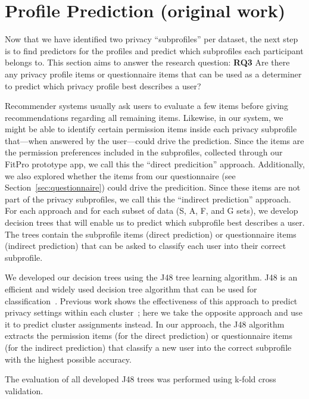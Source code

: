 \section{Profile Prediction (original work)}
\label{sec:prediction}


Now that we have identified two privacy ``subprofiles'' per dataset, the next step is to find predictors for the profiles and predict which subprofiles each participant belongs to. This section aims to answer the research question: \textbf{RQ3} Are there any privacy profile items or questionnaire items that can be used as a determiner to predict which privacy profile best describes a user? 

Recommender systems usually ask users to evaluate a few items before giving recommendations regarding all remaining items. Likewise, in our system, we might be able to identify certain permission items inside each privacy subprofile that---when answered by the user---could drive the prediction. Since the items are the  permission preferences included in the subprofiles, collected through our FitPro prototype app, we call this the ``direct predicition'' approach.
Additionally, we also explored whether the items from our questionnaire (see Section~\ref{sec:questionnaire}) could drive the predicition. Since these items are not part of the privacy subprofiles, we call this the ``indirect prediction'' approach. For each approach and for each subset of data (S, A, F, and G sets), we develop decision trees that will enable us to predict which subprofile best describes a user. The trees contain the subprofile items (direct prediction) or questionnaire items (indirect prediction) that can be asked to classify each user into their correct subprofile.

We developed our decision trees using the J48 tree learning algorithm. J48 is an efficient and widely used decision tree algorithm that can be used for classification~\cite{patil2013performance}. Previous work shows the effectiveness of this approach to predict privacy settings within each cluster~\cite{bahirat2018data}; here we take the opposite approach and use it to predict cluster assignments instead. In our approach, the J48 algorithm extracts the permission items (for the direct prediction) or questionnaire items (for the indirect prediction) that classify a new user into the correct subprofile with the highest possible accuracy.

The evaluation of all developed J48 trees was performed using k-fold cross validation. %


